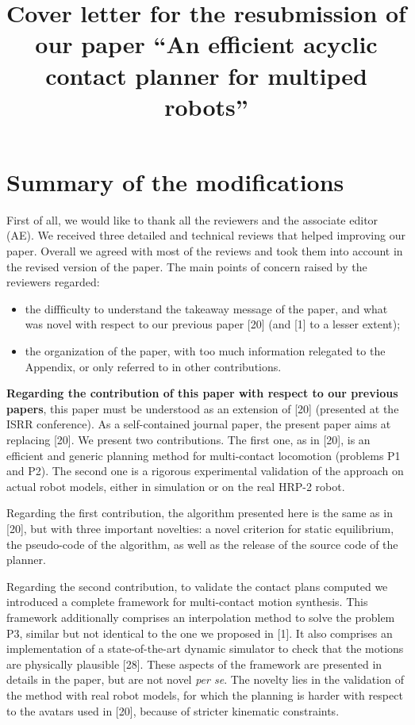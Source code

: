 \documentclass[a4paper]{article}
\author {}
\title {Cover letter for the resubmission of our paper ``An efficient acyclic contact planner for multiped robots''}
\date {}
\begin{document}
\maketitle

\section{Summary of the modifications}

First of all, we would like to thank all the reviewers and the associate editor (AE).
We received three detailed and technical reviews that helped improving our paper.
Overall we agreed with most of the reviews and took them into account in the revised version of the paper.
The main points of concern raised by the reviewers regarded:
\begin{itemize}
\item the diffficulty to understand the takeaway message of the paper, and what was novel with respect to our previous paper [20] (and [1] to a lesser extent);
\item the organization of the paper, with too much information relegated to the Appendix, or only referred to in other contributions.
\end{itemize}

\textbf{Regarding the contribution of this paper with respect to our previous papers}, this paper must be understood
as an extension of [20] (presented at the ISRR conference). As a self-contained journal paper, the present paper aims at replacing [20]. We present two contributions. The first one, as in [20], is an efficient and generic planning method for multi-contact locomotion (problems P1 and P2).
The second one is a rigorous experimental validation of the approach on actual robot models, either in simulation or on the real HRP-2 robot.

Regarding the first contribution, the algorithm presented here is the same as in [20], but with three important novelties: a novel criterion for
static equilibrium, the pseudo-code of the algorithm,
as well as  the release of the source code of the planner.

Regarding the second contribution, to validate the contact plans computed we introduced a complete framework for multi-contact motion synthesis. This framework additionally comprises an interpolation method to solve the problem P3, similar but not identical to the one we proposed in [1]. It also comprises an implementation of a state-of-the-art dynamic simulator to check that the motions are physically plausible [28]. These aspects of the framework are presented in details in the paper, but are not novel \textit{per se}. The novelty lies in the validation of the method with real robot models, for which the planning is harder with respect to the avatars used in [20], because of stricter kinematic constraints.
\end{document}
